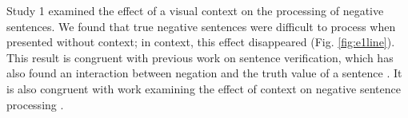\documentclass[10pt,letterpaper]{article}
\begin{document}




Study 1 examined the effect of a visual context on the processing of negative sentences.  We found that true negative sentences were difficult to process when presented without context; in context, this effect disappeared (Fig. \ref{fig:e1line}).  This result is congruent with previous work on sentence verification, which has also found an interaction between negation and the truth value of a sentence \cite{hclark1972, carpenter1975, just1971, just1976}.  It is also congruent with work examining the effect of context on negative sentence processing \cite{wason1965, glenberg1999, ludtke2006, nieuwland2008, dale2011}.  
\end{document}
